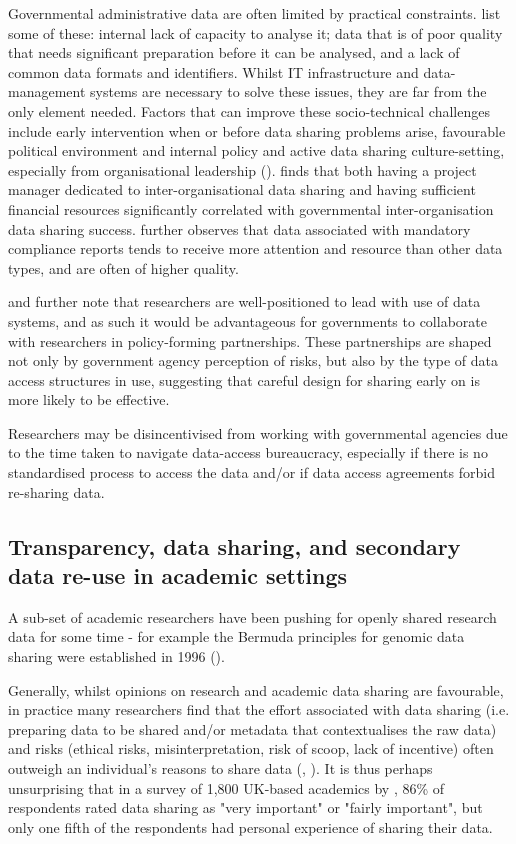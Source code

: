 \documentclass{CUP-JNL-DAP}%
\begin{document}
Governmental administrative data are often limited by practical constraints. \cite{allard_state_2018} list some of these: internal lack of capacity to analyse it; data that is of poor quality that needs significant preparation before it can be analysed, and a lack of common data formats and identifiers. Whilst IT infrastructure and data-management systems are necessary to solve these issues, they are far from the only element needed. Factors that can improve these socio-technical challenges include early intervention when or before data sharing problems arise, favourable political environment and internal policy and active data sharing culture-setting, especially from organisational leadership (\cite{dawes_need_2009}). \cite{gil-garcia_government_2016} finds that both having a project manager dedicated to inter-organisational data sharing and having sufficient financial resources significantly correlated with governmental inter-organisation data sharing success.  \cite{allard_state_2018} further observes that data associated with mandatory compliance reports tends to receive more attention and resource than other data types, and are often of higher quality.

\cite{allard_state_2018} and \cite{graham_navigating_2016} further note that researchers are well-positioned to lead with use of data systems, and as such it would be advantageous for governments to collaborate with researchers in policy-forming partnerships. These partnerships are shaped not only by government agency perception of risks, but also by the type of data access structures in use, suggesting that careful design for sharing early on is more likely to be effective. 

Researchers may be disincentivised from working with governmental agencies due to the time taken to navigate data-access bureaucracy, especially if there is no standardised process to access the data and/or if data access agreements forbid re-sharing data.  

\subsection{Transparency, data sharing, and secondary data re-use in academic settings}
A sub-set of academic researchers have been pushing for openly shared research data for some time - for example the Bermuda principles for genomic data sharing were established in 1996 (\cite{maxson_jones_bermuda_2018}).

Generally, whilst opinions on research and academic data sharing are favourable, in practice many researchers find that the effort associated with data sharing (i.e. preparing data to be shared and/or metadata that contextualises the raw data) and risks (ethical risks, misinterpretation, risk of scoop, lack of incentive) often outweigh an individual’s reasons to share data (\cite{Yimei_Zhu_Open_access_in_uk}, \cite{datasharing_sociology}). It is thus perhaps unsurprising that in a survey of 1,800 UK-based academics by \cite{Yimei_Zhu_Open_access_in_uk}, 86\% of respondents rated data sharing as "very important" or "fairly important", but only one fifth of the respondents had personal experience of sharing their data. 
\end{document}
